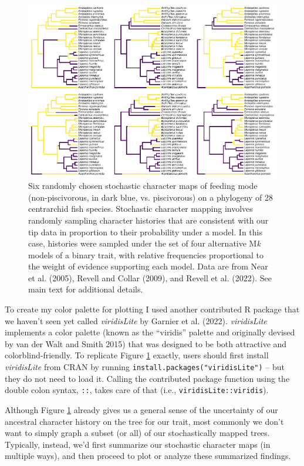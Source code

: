 \documentclass[fleqn,10pt,lineno]{wlpeerj} %
\begin{document}
\begin{figure}
\includegraphics[width=1\linewidth]{Revell.phytools-v2_peerj_files/figure-latex/fig01-simmap-trees-1} \caption{Six randomly chosen stochastic character maps of feeding mode (non-piscivorous, in dark blue, vs. piscivorous) on a phylogeny of 28 centrarchid fish species. Stochastic character mapping involves randomly sampling character histories that are consistent with our tip data in proportion to their probability under a model. In this case, histories were sampled under the set of four alternative M\textit{k} models of a binary trait, with relative frequencies proportional to the weight of evidence supporting each model. Data are from Near et al. (2005), Revell and Collar (2009), and Revell et al. (2022). See main text for additional details.}\label{fig:fig01-simmap-trees}
\end{figure}

To create my color palette for plotting I used another contributed R package that we haven't seen yet called \emph{viridisLite} by Garnier et al. (2022). \emph{viridisLite} implements a color palette (known as the ``viridis'' palette and originally devised by van der Walt and Smith 2015) that was designed to be both attractive and colorblind-friendly. To replicate Figure \ref{fig:fig01-simmap-trees} exactly, users should first install \emph{viridisLite} from CRAN by running \texttt{install.packages("viridisLite")} -- but they do not need to load it. Calling the contributed package function using the double colon syntax, \texttt{::}, takes care of that (i.e., \texttt{viridisLite::viridis}).

Although Figure \ref{fig:fig01-simmap-trees} already gives us a general sense of the uncertainty of our ancestral character history on the tree for our trait, most commonly we don't want to simply graph a subset (or all) of our stochastically mapped trees. Typically, instead, we'd first summarize our stochastic character maps (in multiple ways), and then proceed to plot or analyze these summarized findings.
\end{document}

